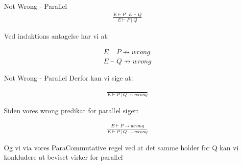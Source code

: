 \begin{frame}{Not Wrong - Parallel}
	\begin{align*}
		\frac{E \vdash P\ \ \ E \vdash Q}{E \vdash P\ |\ Q}
	\end{align*}

	Ved induktions antagelse har vi at:

	\begin{align*}
		E \vdash P \nrightarrow wrong \\
		E \vdash Q \nrightarrow wrong
	\end{align*}
\end{frame}

\begin{frame}{Not Wrong - Parallel}
	Derfor kan vi sige at:

	\begin{align*}
		\frac{}{E \vdash P\ |\ Q \nrightarrow wrong}
	\end{align*}

	Siden vores wrong predikat for parallel siger:

	\begin{align*}
		\frac{E \vdash P \rightarrow wrong}{E \vdash P\ |\ Q \rightarrow wrong}
	\end{align*}

	Og vi via vores ParaCommutative regel ved at det samme holder for Q kan vi konkludere at beviset virker for parallel
\end{frame}
